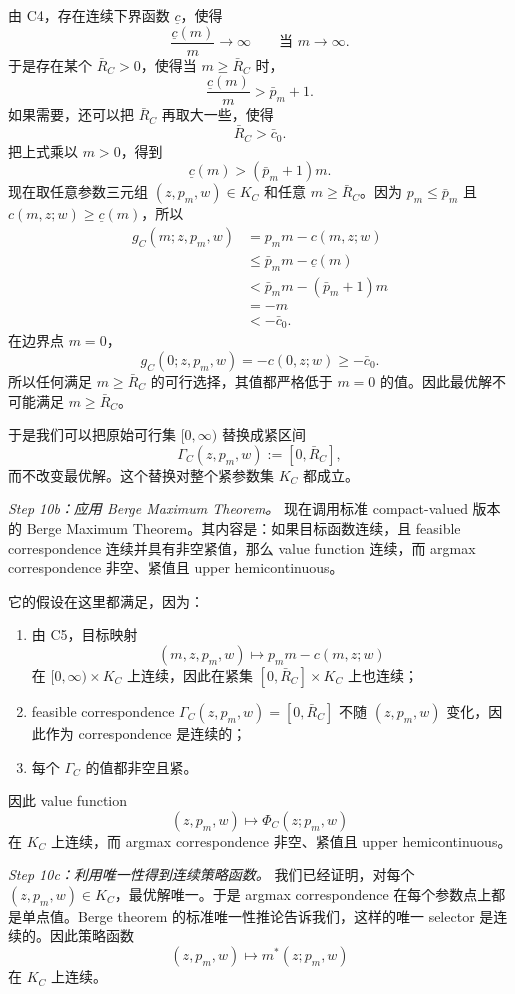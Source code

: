 由 C4，存在连续下界函数 $\underline c$，使得
\[
\frac{\underline c(m)}{m}\to\infty
\qquad\text{当 }m\to\infty.
\]
于是存在某个 $\bar R_C>0$，使得当 $m\ge \bar R_C$ 时，
\[
\frac{\underline c(m)}{m}>\bar p_m+1.
\]
如果需要，还可以把 $\bar R_C$ 再取大一些，使得
\[
\bar R_C>\bar c_0.
\]
把上式乘以 $m>0$，得到
\[
\underline c(m)>(\bar p_m+1)m.
\]
现在取任意参数三元组 $(z,p_m,w)\in K_C$ 和任意 $m\ge \bar R_C$。因为 $p_m\le \bar p_m$ 且 $c(m,z;w)\ge \underline c(m)$，所以
\begin{align*}
g_C(m;z,p_m,w)
&=p_m m-c(m,z;w)\\
&\le \bar p_m m-\underline c(m)\\
&<\bar p_m m-(\bar p_m+1)m\\
&=-m\\
&<-\bar c_0.
\end{align*}
在边界点 $m=0$，
\[
g_C(0;z,p_m,w)=-c(0,z;w)\ge -\bar c_0.
\]
所以任何满足 $m\ge \bar R_C$ 的可行选择，其值都严格低于 $m=0$ 的值。因此最优解不可能满足 $m\ge \bar R_C$。

于是我们可以把原始可行集 $[0,\infty)$ 替换成紧区间
\[
\Gamma_C(z,p_m,w):=[0,\bar R_C],
\]
而不改变最优解。这个替换对整个紧参数集 $K_C$ 都成立。

\textit{Step 10b：应用 Berge Maximum Theorem。}
现在调用标准 compact-valued 版本的 Berge Maximum Theorem。其内容是：如果目标函数连续，且 feasible correspondence 连续并具有非空紧值，那么 value function 连续，而 argmax correspondence 非空、紧值且 upper hemicontinuous。

它的假设在这里都满足，因为：
\begin{enumerate}
    \item 由 C5，目标映射
    \[
    (m,z,p_m,w)\mapsto p_m m-c(m,z;w)
    \]
    在 $[0,\infty)\times K_C$ 上连续，因此在紧集 $[0,\bar R_C]\times K_C$ 上也连续；
    \item feasible correspondence $\Gamma_C(z,p_m,w)=[0,\bar R_C]$ 不随 $(z,p_m,w)$ 变化，因此作为 correspondence 是连续的；
    \item 每个 $\Gamma_C$ 的值都非空且紧。
\end{enumerate}
因此 value function
\[
(z,p_m,w)\mapsto \Phi_C(z;p_m,w)
\]
在 $K_C$ 上连续，而 argmax correspondence 非空、紧值且 upper hemicontinuous。

\textit{Step 10c：利用唯一性得到连续策略函数。}
我们已经证明，对每个 $(z,p_m,w)\in K_C$，最优解唯一。于是 argmax correspondence 在每个参数点上都是单点值。Berge theorem 的标准唯一性推论告诉我们，这样的唯一 selector 是连续的。因此策略函数
\[
(z,p_m,w)\mapsto m^*(z;p_m,w)
\]
在 $K_C$ 上连续。

